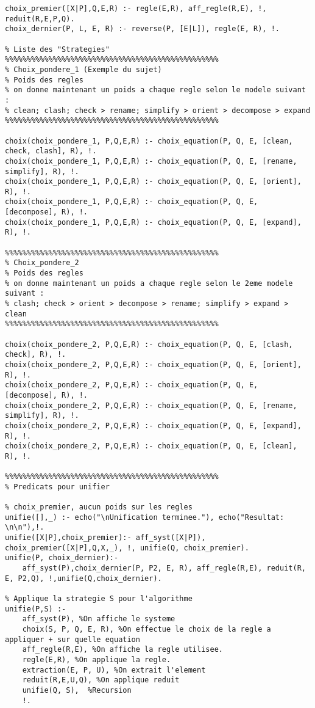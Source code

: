 \documentclass[10pt,a4paper]{report}
\begin{document}
\begin{lstlisting}[caption ={le fichier main.pl}]
choix_premier([X|P],Q,E,R) :- regle(E,R), aff_regle(R,E), !, reduit(R,E,P,Q).
choix_dernier(P, L, E, R) :- reverse(P, [E|L]), regle(E, R), !.

% Liste des "Strategies"
%%%%%%%%%%%%%%%%%%%%%%%%%%%%%%%%%%%%%%%%%%%%%%%%%
% Choix_pondere_1 (Exemple du sujet)
% Poids des regles 
% on donne maintenant un poids a chaque regle selon le modele suivant :
% clean; clash; check > rename; simplify > orient > decompose > expand
%%%%%%%%%%%%%%%%%%%%%%%%%%%%%%%%%%%%%%%%%%%%%%%%%

choix(choix_pondere_1, P,Q,E,R) :- choix_equation(P, Q, E, [clean, check, clash], R), !.
choix(choix_pondere_1, P,Q,E,R) :- choix_equation(P, Q, E, [rename, simplify], R), !.
choix(choix_pondere_1, P,Q,E,R) :- choix_equation(P, Q, E, [orient], R), !.
choix(choix_pondere_1, P,Q,E,R) :- choix_equation(P, Q, E, [decompose], R), !.
choix(choix_pondere_1, P,Q,E,R) :- choix_equation(P, Q, E, [expand], R), !.

%%%%%%%%%%%%%%%%%%%%%%%%%%%%%%%%%%%%%%%%%%%%%%%%%
% Choix_pondere_2 
% Poids des regles
% on donne maintenant un poids a chaque regle selon le 2eme modele suivant :
% clash; check > orient > decompose > rename; simplify > expand > clean
%%%%%%%%%%%%%%%%%%%%%%%%%%%%%%%%%%%%%%%%%%%%%%%%%

choix(choix_pondere_2, P,Q,E,R) :- choix_equation(P, Q, E, [clash, check], R), !.
choix(choix_pondere_2, P,Q,E,R) :- choix_equation(P, Q, E, [orient], R), !.
choix(choix_pondere_2, P,Q,E,R) :- choix_equation(P, Q, E, [decompose], R), !.
choix(choix_pondere_2, P,Q,E,R) :- choix_equation(P, Q, E, [rename, simplify], R), !.
choix(choix_pondere_2, P,Q,E,R) :- choix_equation(P, Q, E, [expand], R), !.
choix(choix_pondere_2, P,Q,E,R) :- choix_equation(P, Q, E, [clean], R), !.

%%%%%%%%%%%%%%%%%%%%%%%%%%%%%%%%%%%%%%%%%%%%%%%%%
% Predicats pour unifier

% choix_premier, aucun poids sur les regles
unifie([],_) :- echo("\nUnification terminee."), echo("Resultat: \n\n"),!.
unifie([X|P],choix_premier):- aff_syst([X|P]), choix_premier([X|P],Q,X,_), !, unifie(Q, choix_premier).
unifie(P, choix_dernier):-
	aff_syst(P),choix_dernier(P, P2, E, R), aff_regle(R,E), reduit(R, E, P2,Q), !,unifie(Q,choix_dernier).

% Applique la strategie S pour l'algorithme
unifie(P,S) :-
	aff_syst(P), %On affiche le systeme
	choix(S, P, Q, E, R), %On effectue le choix de la regle a appliquer + sur quelle equation
	aff_regle(R,E), %On affiche la regle utilisee.
	regle(E,R), %On applique la regle.
	extraction(E, P, U), %On extrait l'element
	reduit(R,E,U,Q), %On applique reduit
	unifie(Q, S),  %Recursion
	!.


\end{lstlisting}
\end{document}
